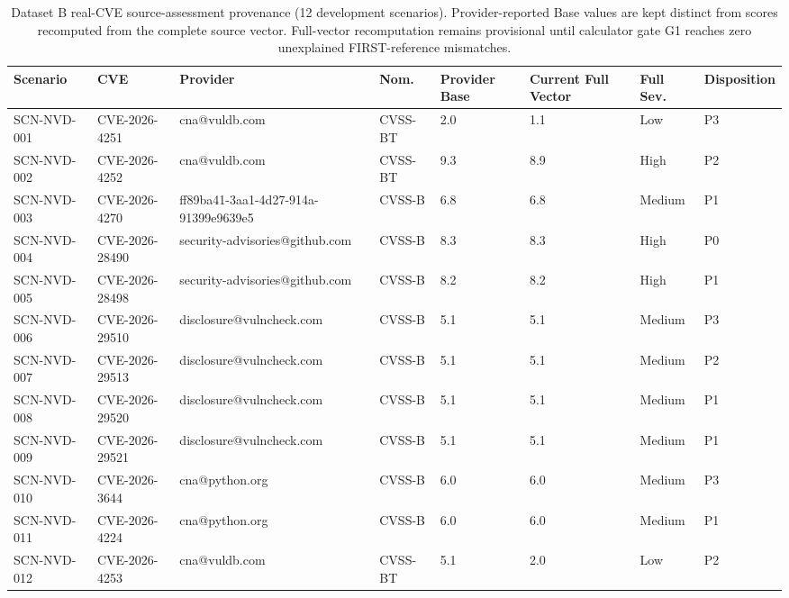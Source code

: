 \begin{landscape}
\begin{table}[p]
\centering\scriptsize
\caption{Dataset B real-CVE source-assessment provenance (12 development scenarios). Provider-reported Base values are kept distinct from scores recomputed from the complete source vector. Full-vector recomputation remains provisional until calculator gate G1 reaches zero unexplained FIRST-reference mismatches.}
\label{tab:dataset_b_v2_real}
\begin{adjustbox}{max width=\linewidth}
\begin{tabular}{llllllll}
\toprule
\textbf{Scenario} & \textbf{CVE} & \textbf{Provider} & \textbf{Nom.} & \textbf{Provider Base} & \textbf{Current Full Vector} & \textbf{Full Sev.} & \textbf{Disposition} \\
\midrule
SCN-NVD-001 & CVE-2026-4251 & cna@vuldb.com & CVSS-BT & 2.0 & 1.1 & Low & P3 \\
SCN-NVD-002 & CVE-2026-4252 & cna@vuldb.com & CVSS-BT & 9.3 & 8.9 & High & P2 \\
SCN-NVD-003 & CVE-2026-4270 & ff89ba41-3aa1-4d27-914a-91399e9639e5 & CVSS-B & 6.8 & 6.8 & Medium & P1 \\
SCN-NVD-004 & CVE-2026-28490 & security-advisories@github.com & CVSS-B & 8.3 & 8.3 & High & P0 \\
SCN-NVD-005 & CVE-2026-28498 & security-advisories@github.com & CVSS-B & 8.2 & 8.2 & High & P1 \\
SCN-NVD-006 & CVE-2026-29510 & disclosure@vulncheck.com & CVSS-B & 5.1 & 5.1 & Medium & P3 \\
SCN-NVD-007 & CVE-2026-29513 & disclosure@vulncheck.com & CVSS-B & 5.1 & 5.1 & Medium & P2 \\
SCN-NVD-008 & CVE-2026-29520 & disclosure@vulncheck.com & CVSS-B & 5.1 & 5.1 & Medium & P1 \\
SCN-NVD-009 & CVE-2026-29521 & disclosure@vulncheck.com & CVSS-B & 5.1 & 5.1 & Medium & P1 \\
SCN-NVD-010 & CVE-2026-3644 & cna@python.org & CVSS-B & 6.0 & 6.0 & Medium & P3 \\
SCN-NVD-011 & CVE-2026-4224 & cna@python.org & CVSS-B & 6.0 & 6.0 & Medium & P1 \\
SCN-NVD-012 & CVE-2026-4253 & cna@vuldb.com & CVSS-BT & 5.1 & 2.0 & Low & P2 \\
\bottomrule
\end{tabular}
\end{adjustbox}
\end{table}
\end{landscape}

